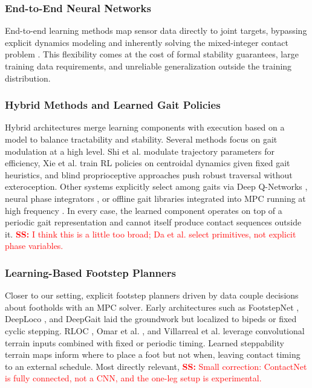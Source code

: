 \subsubsection{End-to-End Neural Networks}
End-to-end learning methods map sensor data directly to joint
targets, bypassing explicit dynamics modeling and inherently solving
the mixed-integer contact problem \cite{zhang_learning_2023,
zhang_novel_2024}. This flexibility comes at the cost of formal
stability guarantees, large training data requirements, and
unreliable generalization outside the training distribution.

\subsubsection{Hybrid Methods and Learned Gait Policies}
Hybrid architectures merge learning components with execution based
on a model to balance tractability and stability. Several methods
focus on gait modulation at a high level. Shi et al.
\cite{shi_terrain-aware_2023} modulate trajectory parameters for
efficiency, Xie et al. \cite{xie_glide_2023} train RL policies on
centroidal dynamics given fixed gait heuristics, and blind
proprioceptive approaches \cite{duan_sim--real_2022,
siekmann_blind_2021, lee_learning_2020} push robust traversal without
exteroception. Other systems explicitly select among gaits via Deep
Q-Networks \cite{da_learning_2020}, neural phase integrators
\cite{yang_fast_2021}, or offline gait libraries integrated into
MPC running at high frequency \cite{sun_online_2024}. In every case, the learned
component operates on top of a periodic gait representation and
cannot itself produce contact sequences outside it.
\textcolor{red}{\textbf{SS:} I think this is a little too broad; Da
et al. select primitives, not explicit phase variables.}

\subsubsection{Learning-Based Footstep Planners}
Closer to our setting, explicit footstep planners driven by data
couple decisions about footholds with an MPC solver. Early architectures such
as FootstepNet \cite{gaspard_footstepnet_2024}, DeepLoco
\cite{peng_deeploco_2017}, and DeepGait \cite{tsounis_deepgait_2020}
laid the groundwork but localized to bipeds or fixed cyclic stepping.
RLOC \cite{gangapurwala_rloc_2022}, Omar et al.
\cite{omar_fast_2022}, and Villarreal et al.
\cite{villarreal_fast_2019} leverage convolutional terrain inputs
combined with fixed or periodic timing. Learned steppability terrain
maps \cite{asselmeier_steppability-informed_2024,
omar_safesteps_2023} inform where to place a foot but not when,
leaving contact timing to an external schedule. Most directly
relevant, \textcolor{red}{\textbf{SS:} Small correction: ContactNet is
fully connected, not a CNN, and the one-leg setup is experimental.}

